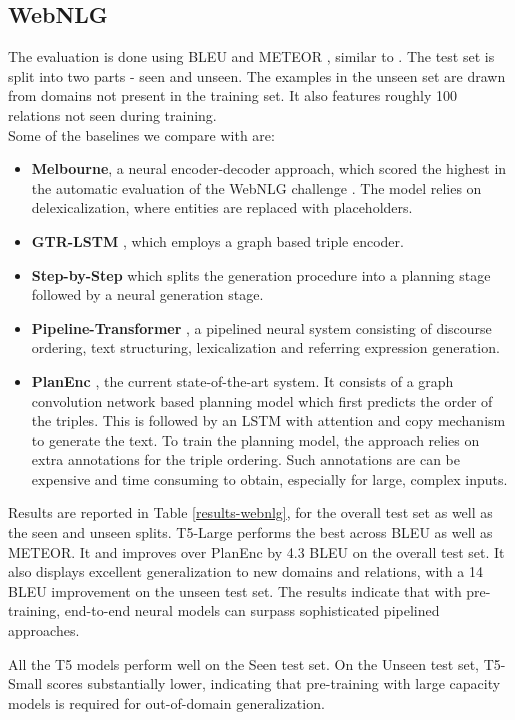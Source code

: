 \documentclass[11pt,a4paper]{article}
\begin{document}
\subsection{WebNLG}
The evaluation is done using BLEU and METEOR \cite{lavie2007meteor}, similar to \cite{ferreira2019neural}. The test set is split into two parts - seen and unseen. The examples in the unseen set are drawn from domains not present in the training set. It also features roughly 100 relations not seen during training. \\
Some of the baselines we compare with are:
\begin{itemize}
    \item \textbf{Melbourne}, a neural encoder-decoder approach, which scored the highest in the automatic evaluation of the WebNLG challenge \cite{gardent2017webnlg}. The model relies on delexicalization, where entities are replaced with placeholders.
    \item \textbf{GTR-LSTM} \cite{distiawan2018gtr}, which employs a graph based triple encoder.
    \item \textbf{Step-by-Step} \cite{moryossef2019step} which splits the generation procedure into a planning stage followed by a neural generation stage.
    \item \textbf{Pipeline-Transformer} \cite{ferreira2019neural}, a pipelined neural system consisting of discourse ordering, text structuring, lexicalization and referring expression generation.
    \item \textbf{PlanEnc} \cite{zhao2020bridging}, the current state-of-the-art system. It consists of a graph convolution network based planning model which first predicts the order of the triples. This is followed by an LSTM with attention and copy mechanism to generate the text. To train the planning model, the approach relies on extra annotations for the triple ordering. Such annotations are can be expensive and time consuming to obtain, especially for large, complex inputs.
\end{itemize}
\par Results are reported in Table \ref{results-webnlg}, for the overall test set as well as the seen and unseen splits. T5-Large performs the best across BLEU as well as METEOR. It and improves over PlanEnc by 4.3 BLEU on the overall test set. It also displays excellent generalization to new domains and relations, with a 14 BLEU improvement on the unseen test set. The results indicate that with pre-training, end-to-end neural models can surpass sophisticated pipelined approaches.
\par All the T5 models perform well on the Seen test set. On the Unseen test set, T5-Small scores substantially lower, indicating that pre-training with large capacity models is required for out-of-domain generalization.
\end{document}

